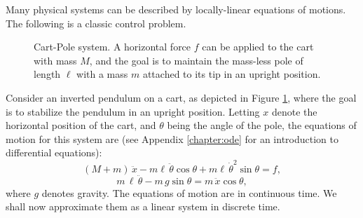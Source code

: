 \begin{example}
    Many physical systems can be described by locally-linear equations of motions. The following is a classic control problem.
\begin{figure}[h!]
    \centering
{}
    \caption{Cart-Pole system. A horizontal force $f$ can be applied to the cart with mass $M$, and the goal is to maintain the mass-less pole of length $\ell$ with a mass $m$ attached to its tip in an upright position.}
    \label{fig:cart-pole}
\end{figure}

    Consider an inverted pendulum on a cart, as depicted in Figure \ref{fig:cart-pole}, where the goal is to stabilize the pendulum in an upright position. Letting $x$ denote the horizontal position of the cart, and $\theta$ being the angle of the pole, the equations of motion for this system are (see Appendix \ref{chapter:ode} for an introduction to differential equations):
\[
(M + m)\,\ddot{x} - m\ell\,\ddot{\theta}\cos\theta + m\ell\,\dot{\theta}^2\sin\theta = f,
\]
\[
m\,\ell\,\ddot{\theta} - m\,g\sin\theta = m\,\ddot{x}\cos\theta,
\]
where $g$ denotes gravity. The equations of motion are in continuous time. We shall now approximate them as a linear system in discrete time.


\end{example}
